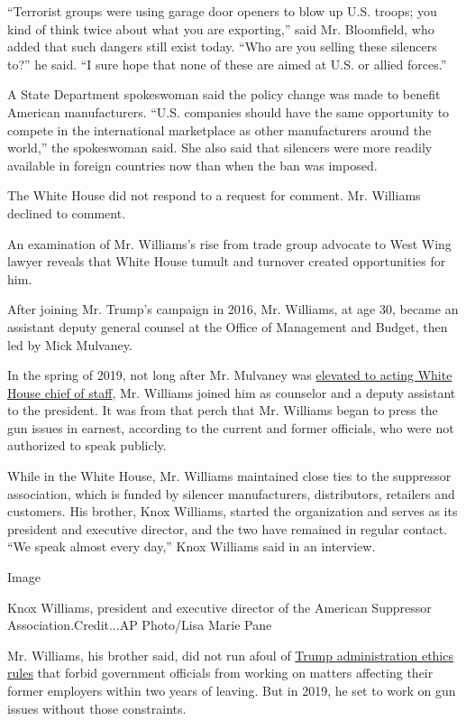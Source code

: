 ``Terrorist groups were using garage door openers to blow up U.S.
troops; you kind of think twice about what you are exporting,'' said Mr.
Bloomfield, who added that such dangers still exist today. ``Who are you
selling these silencers to?'' he said. ``I sure hope that none of these
are aimed at U.S. or allied forces.''

A State Department spokeswoman said the policy change was made to
benefit American manufacturers. ``U.S. companies should have the same
opportunity to compete in the international marketplace as other
manufacturers around the world,'' the spokeswoman said. She also said
that silencers were more readily available in foreign countries now than
when the ban was imposed.

The White House did not respond to a request for comment. Mr. Williams
declined to comment.

An examination of Mr. Williams's rise from trade group advocate to West
Wing lawyer reveals that White House tumult and turnover created
opportunities for him.

After joining Mr. Trump's campaign in 2016, Mr. Williams, at age 30,
became an assistant deputy general counsel at the Office of Management
and Budget, then led by Mick Mulvaney.

In the spring of 2019, not long after Mr. Mulvaney was
\href{https://www.nytimes.com/2018/12/14/us/politics/mick-mulvaney-trump-chief-of-staff.html}{elevated
to acting White House chief of staff}, Mr. Williams joined him as
counselor and a deputy assistant to the president. It was from that
perch that Mr. Williams began to press the gun issues in earnest,
according to the current and former officials, who were not authorized
to speak publicly.

While in the White House, Mr. Williams maintained close ties to the
suppressor association, which is funded by silencer manufacturers,
distributors, retailers and customers. His brother, Knox Williams,
started the organization and serves as its president and executive
director, and the two have remained in regular contact. ``We speak
almost every day,'' Knox Williams said in an interview.

Image

Knox Williams, president and executive director of the American
Suppressor Association.Credit...AP Photo/Lisa Marie Pane

Mr. Williams, his brother said, did not run afoul of
\href{https://www.nytimes.com/2017/01/28/us/politics/trump-toughens-some-facets-of-lobbying-ban-and-weakens-others.html}{Trump
administration ethics rules} that forbid government officials from
working on matters affecting their former employers within two years of
leaving. But in 2019, he set to work on gun issues without those
constraints.

